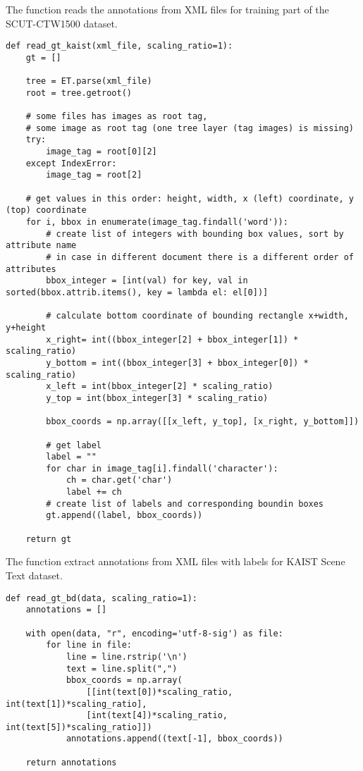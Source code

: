 The function  reads the annotations from  XML files for training part of the SCUT-CTW1500 dataset.

\begin{lstlisting}[caption=read\_gt\_kaist]
def read_gt_kaist(xml_file, scaling_ratio=1):
    gt = []

    tree = ET.parse(xml_file)
    root = tree.getroot()

    # some files has images as root tag, 
    # some image as root tag (one tree layer (tag images) is missing)
    try:
        image_tag = root[0][2]
    except IndexError:
        image_tag = root[2]

    # get values in this order: height, width, x (left) coordinate, y (top) coordinate
    for i, bbox in enumerate(image_tag.findall('word')):
        # create list of integers with bounding box values, sort by attribute name
        # in case in different document there is a different order of attributes
        bbox_integer = [int(val) for key, val in sorted(bbox.attrib.items(), key = lambda el: el[0])]
        
        # calculate bottom coordinate of bounding rectangle x+width, y+height
        x_right= int((bbox_integer[2] + bbox_integer[1]) * scaling_ratio)
        y_bottom = int((bbox_integer[3] + bbox_integer[0]) * scaling_ratio)
        x_left = int(bbox_integer[2] * scaling_ratio)
        y_top = int(bbox_integer[3] * scaling_ratio)

        bbox_coords = np.array([[x_left, y_top], [x_right, y_bottom]])

        # get label
        label = ""
        for char in image_tag[i].findall('character'):
            ch = char.get('char')
            label += ch
        # create list of labels and corresponding boundin boxes
        gt.append((label, bbox_coords))

    return gt
\end{lstlisting}

The function  extract annotations from XML files with labels for KAIST Scene Text dataset.

\begin{lstlisting}[caption=read\_gt\_bd]
def read_gt_bd(data, scaling_ratio=1):
    annotations = []

    with open(data, "r", encoding='utf-8-sig') as file:
        for line in file:
            line = line.rstrip('\n')
            text = line.split(",")
            bbox_coords = np.array(
                [[int(text[0])*scaling_ratio, int(text[1])*scaling_ratio], 
                [int(text[4])*scaling_ratio, int(text[5])*scaling_ratio]])
            annotations.append((text[-1], bbox_coords))

    return annotations

\end{lstlisting}

